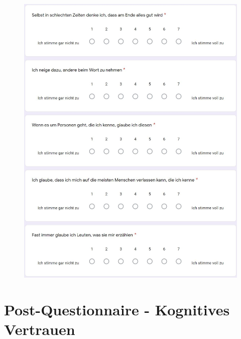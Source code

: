 \documentclass[a4paper,11pt]{article}%
\renewcommand{\\}{\vspace*{0.5\baselineskip} \newline}
\begin{document}
	\begin{figure}[H]
	\centering
		\begin{footnotesize}
			\includegraphics[scale=0.6]{Abbildungen/Fragebogen/Post-Questionnaire/PQG4}
		\end{footnotesize}
	\end{figure}	

\newpage
\section{Post-Questionnaire - Kognitives Vertrauen}	
\label{Post-Questionnaire - Kognitives Vertrauen}	
\end{document}
